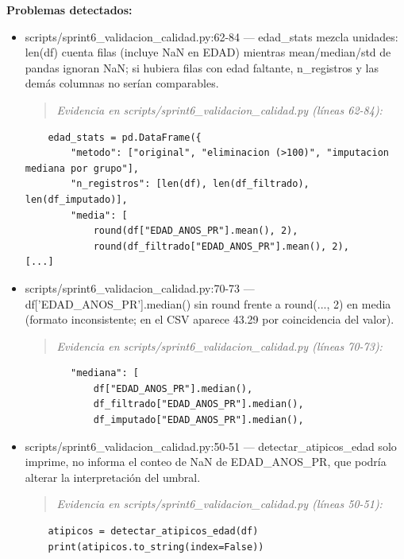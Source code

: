\begin{tcolorbox}[riesgo]
\textbf{Problemas detectados:}
\begin{itemize}
  \item scripts/sprint6\_validacion\_calidad.py:62-84 --- edad\_stats mezcla unidades: len(df) cuenta filas (incluye NaN en EDAD) mientras mean/median/std de pandas ignoran NaN; si hubiera filas con edad faltante, n\_registros y las demás columnas no serían comparables.
\begin{quote}\footnotesize\ttfamily
\noindent\emph{Evidencia en scripts/sprint6\_validacion\_calidad.py (líneas 62-84):}
\end{quote}
\begin{lstlisting}
    edad_stats = pd.DataFrame({
        "metodo": ["original", "eliminacion (>100)", "imputacion mediana por grupo"],
        "n_registros": [len(df), len(df_filtrado), len(df_imputado)],
        "media": [
            round(df["EDAD_ANOS_PR"].mean(), 2),
            round(df_filtrado["EDAD_ANOS_PR"].mean(), 2),
[...]
\end{lstlisting}

  \item scripts/sprint6\_validacion\_calidad.py:70-73 --- df['EDAD\_ANOS\_PR'].median() sin round frente a round(..., 2) en media (formato inconsistente; en el CSV aparece 43.29 por coincidencia del valor).
\begin{quote}\footnotesize\ttfamily
\noindent\emph{Evidencia en scripts/sprint6\_validacion\_calidad.py (líneas 70-73):}
\end{quote}
\begin{lstlisting}
        "mediana": [
            df["EDAD_ANOS_PR"].median(),
            df_filtrado["EDAD_ANOS_PR"].median(),
            df_imputado["EDAD_ANOS_PR"].median(),
\end{lstlisting}

  \item scripts/sprint6\_validacion\_calidad.py:50-51 --- detectar\_atipicos\_edad solo imprime, no informa el conteo de NaN de EDAD\_ANOS\_PR, que podría alterar la interpretación del umbral.
\begin{quote}\footnotesize\ttfamily
\noindent\emph{Evidencia en scripts/sprint6\_validacion\_calidad.py (líneas 50-51):}
\end{quote}
\begin{lstlisting}
    atipicos = detectar_atipicos_edad(df)
    print(atipicos.to_string(index=False))
\end{lstlisting}

\end{itemize}
\end{tcolorbox}

